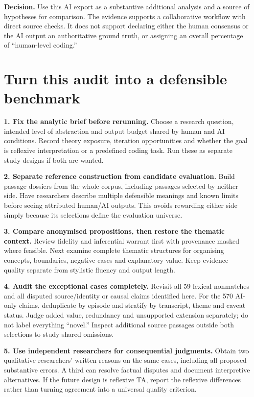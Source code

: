 \documentclass[10pt,a4paper]{article}
\newcommand{\kicker}[1]{{\sffamily\small\bfseries\color{teal}#1}\par\vspace{5pt}}
\newcommand{\page}[2]{\clearpage\kicker{#1}\section*{#2}}
\begin{document}
\begin{takeaway}
\textbf{Decision.} Use this AI export as a substantive additional analysis and a source of hypotheses for comparison. The evidence supports a collaborative workflow with direct source checks. It does not support declaring either the human consensus or the AI output an authoritative ground truth, or assigning an overall percentage of ``human-level coding.''
\end{takeaway}

\page{13 / NEXT VALIDATION DESIGN}{Turn this audit into a defensible benchmark}
\textbf{1. Fix the analytic brief before rerunning.} Choose a research question, intended level of abstraction and output budget shared by human and AI conditions. Record theory exposure, iteration opportunities and whether the goal is reflexive interpretation or a predefined coding task. Run these as separate study designs if both are wanted.

\textbf{2. Separate reference construction from candidate evaluation.} Build passage dossiers from the whole corpus, including passages selected by neither side. Have researchers describe multiple defensible meanings and known limits before seeing attributed human/AI outputs. This avoids rewarding either side simply because its selections define the evaluation universe.

\textbf{3. Compare anonymised propositions, then restore the thematic context.} Review fidelity and inferential warrant first with provenance masked where feasible. Next examine complete thematic structures for organising concepts, boundaries, negative cases and explanatory value. Keep evidence quality separate from stylistic fluency and output length.

\textbf{4. Audit the exceptional cases completely.} Revisit all 59 lexical nonmatches and all disputed source/identity or causal claims identified here. For the 570 AI-only claims, deduplicate by episode and stratify by transcript, theme and caveat status. Judge added value, redundancy and unsupported extension separately; do not label everything ``novel.'' Inspect additional source passages outside both selections to study shared omissions.

\textbf{5. Use independent researchers for consequential judgments.} Obtain two qualitative researchers' written reasons on the same cases, including all proposed substantive errors. A third can resolve factual disputes and document interpretive alternatives. If the future design is reflexive TA, report the reflexive differences rather than turning agreement into a universal quality criterion.
\end{document}
